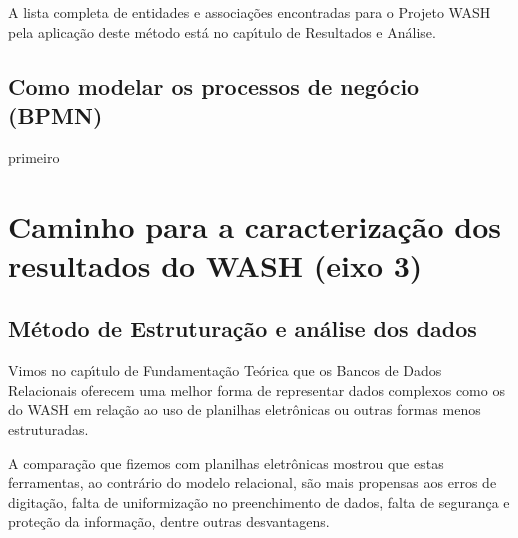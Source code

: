 \documentclass[
12pt,		%
openright,	%
twoside,  %
a4paper,			%
chapter=TITLE,		%
english,			%
french,				%
spanish,			%
brazil				%
]{USPSC-classe/USPSC}
\begin{document}
A lista completa de entidades e associa\c{c}\~oes encontradas para o Projeto WASH pela aplica\c{c}\~ao deste m\'etodo est\'a no cap\'{\i}tulo de Resultados e An\'alise.














\subsection[Como modelar os processos de neg\'ocio (BPMN)]{Como modelar os processos de neg\'ocio (BPMN)}\label{Como modelar os processos de neg\'ocio (BPMN)}
primeiro














\section[Caminho para a caracteriza\c{c}\~ao dos resultados do WASH (eixo 3)]{Caminho para a caracteriza\c{c}\~ao dos resultados do WASH (eixo 3)}\label{Caminho para a caracteriza\c{c}\~ao dos resultados do WASH (eixo 3)}
\subsection[M\'etodo de Estrutura\c{c}\~ao e an\'alise dos dados]{M\'etodo de Estrutura\c{c}\~ao e an\'alise dos dados}\label{M\'etodo de Estrutura\c{c}\~ao e an\'alise dos dados}
Vimos no cap\'{\i}tulo de Fundamenta\c{c}\~ao Te\'orica que os Bancos de Dados Relacionais oferecem uma melhor forma de representar dados complexos como os do WASH em rela\c{c}\~ao ao uso de planilhas eletr\^onicas ou outras formas menos estruturadas.














A compara\c{c}\~ao que fizemos com planilhas eletr\^onicas mostrou que estas ferramentas, ao contr\'ario do modelo relacional, s\~ao mais propensas aos erros de digita\c{c}\~ao, falta de uniformiza\c{c}\~ao no preenchimento de dados, falta de seguran\c{c}a e prote\c{c}\~ao da informa\c{c}\~ao, dentre outras desvantagens.
\end{document}
